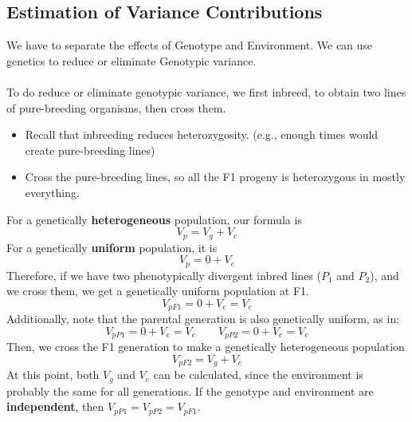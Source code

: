 \documentclass[10pt]{article}
\begin{document}
\subsection*{Estimation of Variance Contributions}
We have to separate the effects of Genotype and Environment.  We can use genetics to reduce or eliminate Genotypic variance.\\\\
To do reduce or eliminate genotypic variance, we first inbreed, to obtain two lines of pure-breeding organisms, then cross them.
\begin{itemize}
	\item Recall that inbreeding reduces heterozygosity.  (e.g., enough times would create pure-breeding lines)
	\item Cross the pure-breeding lines, so all the F1 progeny is heterozygous in mostly everything.
\end{itemize}
For a genetically \textbf{heterogeneous} population, our formula is
\[V_p = V_g + V_e\]
For a genetically \textbf{uniform} population, it is
\[V_p = 0 + V_e\]
Therefore, if we have two phenotypically divergent inbred lines ($P_1$ and $P_2$), and we cross them, we get a genetically uniform population at F1.
\[V_{pF1} = 0 + V_e = V_e\]
Additionally, note that the parental generation is also genetically uniform, as in:
\[V_{pP1} = 0 + V_e = V_e \quad\quad V_{pP2} = 0 + V_e = V_e\]
Then, we cross the F1 generation to make a genetically heterogeneous population
\[V_{pF2} = V_g + V_e\]
At this point, both $V_g$ and $V_e$ can be calculated, since the environment is probably the same for all generations.  If the genotype and environment are \textbf{independent}, then $V_{pP1} = V_{pP2} = V_{pF1}$.
\end{document}
